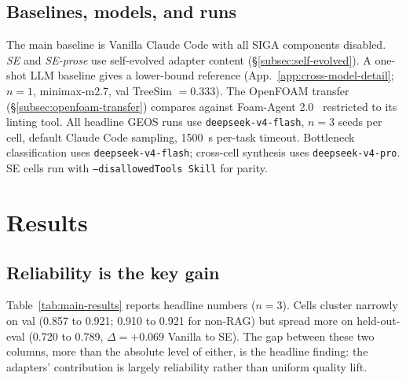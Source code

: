 \documentclass{article}
\begin{document}
\subsection{Baselines, models, and runs}
\label{subsec:baselines}
The main baseline is Vanilla Claude Code with all SIGA components disabled. \emph{SE} and \emph{SE-prose} use self-evolved adapter content (\S\ref{subsec:self-evolved}). A one-shot LLM baseline gives a lower-bound reference (App.~\ref{app:cross-model-detail}; $n=1$, minimax-m2.7, val TreeSim $=0.333$). The OpenFOAM transfer (\S\ref{subsec:openfoam-transfer}) compares against Foam-Agent 2.0~\citep{foamagent2025} restricted to its linting tool. All headline GEOS runs use \texttt{deepseek-v4-flash}, $n=3$ seeds per cell, default Claude Code sampling, 1500~s per-task timeout. Bottleneck classification uses \texttt{deepseek-v4-flash}; cross-cell synthesis uses \texttt{deepseek-v4-pro}. SE cells run with \texttt{--disallowedTools Skill} for parity.


\section{Results}
\label{sec:results}

\subsection{Reliability is the key gain}
\label{subsec:quality}

Table~\ref{tab:main-results} reports headline numbers ($n=3$). Cells cluster narrowly on val (0.857 to 0.921; 0.910 to 0.921 for non-RAG) but spread more on held-out-eval (0.720 to 0.789, $\Delta = +0.069$ Vanilla to SE). The gap between these two columns, more than the absolute level of either, is the headline finding: the adapters' contribution is largely reliability rather than uniform quality lift.
\end{document}
